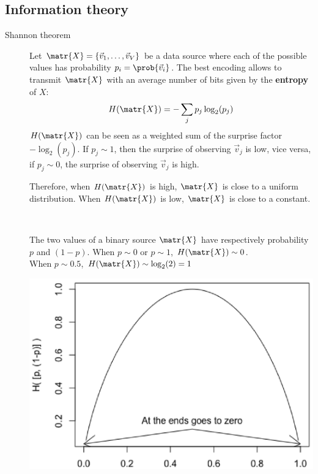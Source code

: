 \subsection{Information theory} \label{sec:information_theory}

\begin{description}
    \item[Shannon theorem] 
        Let $\matr{X} = \{ \vec{v}_1, \dots, \vec{v}_V \}$ be a data source where 
        each of the possible values has probability $p_i = \prob{\vec{v}_i}$.
        The best encoding allows to transmit $\matr{X}$ with 
        an average number of bits given by the \textbf{entropy} of $X$: 
        \[ H(\matr{X}) = - \sum_j p_j \log_2(p_j) \]
        $H(\matr{X})$ can be seen as a weighted sum of the surprise factor $-\log_2(p_j)$.
        If $p_j \sim 1$, then the surprise of observing $\vec{v}_j$ is low, vice versa,
        if $p_j \sim 0$, the surprise of observing $\vec{v}_j$ is high.
        
        Therefore, when $H(\matr{X})$ is high, $\matr{X}$ is close to a uniform distribution.
        When $H(\matr{X})$ is low, $\matr{X}$ is close to a constant.

        \begin{example} \phantom{}\\
            \begin{minipage}{.50\linewidth}
                The two values of a binary source $\matr{X}$ have respectively probability $p$ and $(1-p)$.
                When $p \sim 0$ or $p \sim 1$, $H(\matr{X}) \sim 0$.\\
                When $p \sim 0.5$, $H(\matr{X}) \sim \log_2(2)=1$
            \end{minipage}
            \begin{minipage}{.45\linewidth}
                \centering
                \includegraphics[width=\linewidth]{img/binary_entropy.png}
            \end{minipage}
        \end{example}


\end{description}
